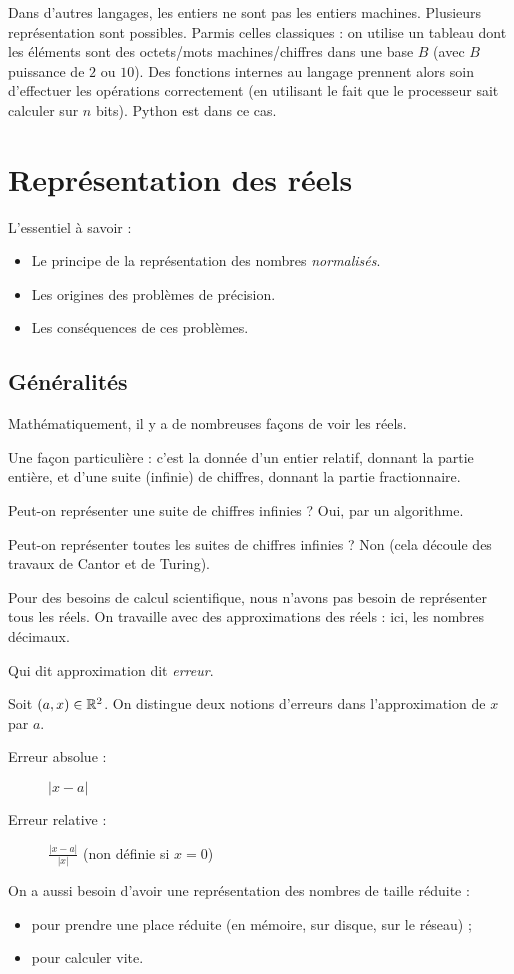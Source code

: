 Dans d'autres langages, les entiers ne sont pas les entiers machines. Plusieurs
  représentation sont possibles. Parmis celles classiques : on utilise un tableau dont les
  éléments sont des octets/mots machines/chiffres dans une base $B$  (avec $B$ puissance de $2$ ou $10$).
 Des fonctions internes  au langage prennent alors soin d'effectuer les
  opérations correctement (en utilisant le fait que le processeur sait
  calculer sur $n$ bits). Python est dans ce cas.

\section{Représentation des réels}

L'essentiel à savoir :
\begin{itemize}
\item[\textbullet] Le principe de la représentation des nombres \emph{normalisés}.
\item[\textbullet] Les origines des problèmes de précision.
\item[\textbullet] Les conséquences de ces problèmes.
\end{itemize}
\subsection{Généralités}
Mathématiquement, il y a de nombreuses façons de voir les réels.

Une façon particulière : c'est la donnée d'un entier relatif, donnant la partie entière, et d'une
suite (infinie) de chiffres, donnant la partie fractionnaire.

Peut-on représenter une suite de chiffres infinies ? Oui, par un algorithme.

Peut-on représenter toutes les suites de chiffres infinies ? Non (cela découle des travaux de Cantor et de  Turing).

Pour des besoins de calcul scientifique, nous n'avons pas besoin de représenter tous les réels. On travaille avec des approximations des réels : ici, les nombres décimaux.
\begin{rem}
  Qui dit approximation dit \emph{erreur}.
\end{rem}
\begin{defi}
Soit $(a,x)\in\mathbb{R}^2$. On distingue deux notions d'erreurs dans l'approximation de $x$ par $a$.
\begin{description}
\item[Erreur absolue :] $|x-a|$ 
\item[Erreur relative :]  $\displaystyle\frac{|x-a|}{|x|}$ (non définie si $x=0$)
\end{description}
\end{defi}
On a aussi besoin d'avoir une représentation des nombres de taille réduite :
\begin{itemize}
\item[\textbullet] pour prendre une place réduite (en mémoire, sur disque, sur le réseau) ;
\item[\textbullet] pour calculer vite.
\end{itemize}

